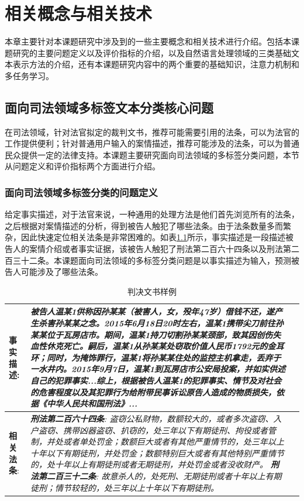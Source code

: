 
\chapter{相关概念与相关技术}
本章主要针对本课题研究中涉及到的一些主要概念和相关技术进行介绍。包括本课题研究的主要问题定义以及评价指标的介绍，以及自然语言处理领域的三类基础文本表示方法的介绍，还有本课题研究内容中的两个重要的基础知识，注意力机制和多任务学习。
\section{面向司法领域多标签文本分类核心问题}
在司法领域，针对法官拟定的裁判文书，推荐可能需要引用的法条，可以为法官的工作提供便利；针对普通用户输入的案情描述，推荐可能涉及的法条，可以为普通民众提供一定的法律支持。本课题主要研究面向司法领域的多标签分类问题，本节从问题定义和评价指标两个方面进行介绍。
\subsection{面向司法领域多标签分类的问题定义}


给定事实描述，对于法官来说，一种通用的处理方法是他们首先浏览所有的法条，之后根据对案情描述的分析，得到被告人触犯了哪些法条。由于法条数量多而繁杂，因此快速定位相关法条是非常困难的。如表\ref{t:example}所示，事实描述是一段描述被告人的案情介绍或者事实证据，该被告人触犯了刑法第二百六十四条以及刑法第二百三十二条。本课题面向司法领域的多标签分类问题是以事实描述为输入，预测被告人可能涉及了哪些法条。
\begin{table}[hbt]
    \caption{判决文书样例}
    \label{t:example}
    \centering
    \begin{tabular}{lp{12cm}p{7cm}}
    \hline
    \textbf{事实描述}: &\emph{被告人温某1供称因孙某某（被害人，女，殁年47岁）借钱不还，遂产生杀害孙某某之念。2015年6月18日20时左右，温某1携带尖刀前往孙某某位于瓦房店市。期间，温某1持刀切割孙某某颈部，致其因创伤失血性休克死亡。嗣后，温某1从孙某某处窃取价值人民币1792元的金耳环；同时，为掩饰罪行，温某1将孙某某住处的监控主机拿走，丢弃于一水井内。2015年9月7日，温某1到瓦房店市公安局投案，并如实供述自己的犯罪事实...综上，根据被告人温某1的犯罪事实、情节及对社会的危害程度以及其犯罪行为给附带民事诉讼原告人造成的物质损失，依据《中华人民共和国刑法》...}\\
    \hline
    \textbf{相关法条}: 
    &\emph{\textbf{刑法第二百六十四条}: 盗窃公私财物，数额较大的，或者多次盗窃、入户盗窃、携带凶器盗窃、扒窃的，处三年以下有期徒刑、拘役或者管制，并处或者单处罚金；数额巨大或者有其他严重情节的，处三年以上十年以下有期徒刑，并处罚金；数额特别巨大或者有其他特别严重情节的，处十年以上有期徒刑或者无期徒刑，并处罚金或者没收财产。 \newline
    \textbf{刑法第二百三十二条}: 故意杀人的，处死刑、无期徒刑或者十年以上有期徒刑；情节较轻的，处三年以上十年以下有期徒刑。}\\
    \hline
    \end{tabular}
\end{table}
